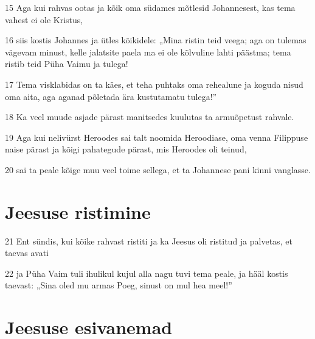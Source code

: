 \par 15 Aga kui rahvas ootas ja kõik oma südames mõtlesid Johannesest, kas tema vahest ei ole Kristus,
\par 16 siis kostis Johannes ja ütles kõikidele: „Mina ristin teid veega; aga on tulemas vägevam minust, kelle jalatsite paela ma ei ole kõlvuline lahti päästma; tema ristib teid Püha Vaimu ja tulega!
\par 17 Tema visklabidas on ta käes, et teha puhtaks oma rehealune ja koguda nisud oma aita, aga aganad põletada ära kustutamatu tulega!”
\par 18 Ka veel muude asjade pärast manitsedes kuulutas ta armuõpetust rahvale.
\par 19 Aga kui nelivürst Heroodes sai talt noomida Heroodiase, oma venna Filippuse naise pärast ja kõigi pahategude pärast, mis Heroodes oli teinud,
\par 20 sai ta peale kõige muu veel toime sellega, et ta Johannese pani kinni vanglasse.

\section*{Jeesuse ristimine}

\par 21 Ent sündis, kui kõike rahvast ristiti ja ka Jeesus oli ristitud ja palvetas, et taevas avati
\par 22 ja Püha Vaim tuli ihulikul kujul alla nagu tuvi tema peale, ja hääl kostis taevast: „Sina oled mu armas Poeg, sinust on mul hea meel!”

\section*{Jeesuse esivanemad}

